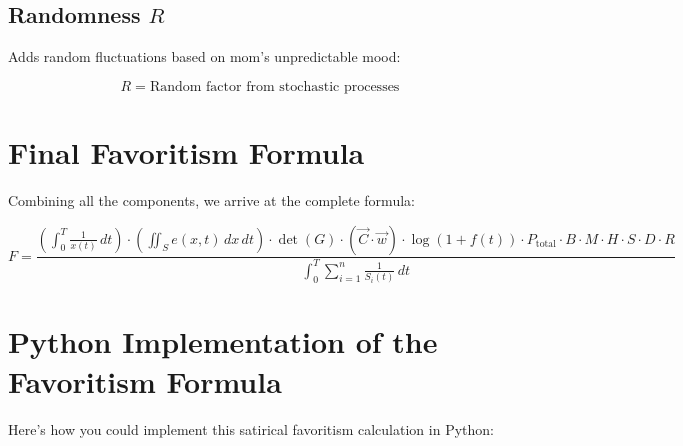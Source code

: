 \documentclass[12pt]{article}
\begin{document}
\subsection{Randomness $R$}
Adds random fluctuations based on mom's unpredictable mood:

\begin{equation}
R = \text{Random factor from stochastic processes}
\end{equation}

\section{Final Favoritism Formula}

Combining all the components, we arrive at the complete formula:

\begin{equation}
F = \frac{\left( \displaystyle \int_0^T \frac{1}{x(t)} \, dt \right) \cdot \left( \displaystyle \iint_S e(x, t) \, dx \, dt \right) \cdot \det(G) \cdot \left( \vec{C} \cdot \vec{w} \right) \cdot \log(1 + f(t)) \cdot P_{\text{total}} \cdot B \cdot M \cdot H \cdot S \cdot D \cdot R}{\displaystyle \int_0^T \sum_{i=1}^{n} \frac{1}{S_i(t)} \, dt}
\end{equation}

\section{Python Implementation of the Favoritism Formula}

Here’s how you could implement this satirical favoritism calculation in Python:
\end{document}
